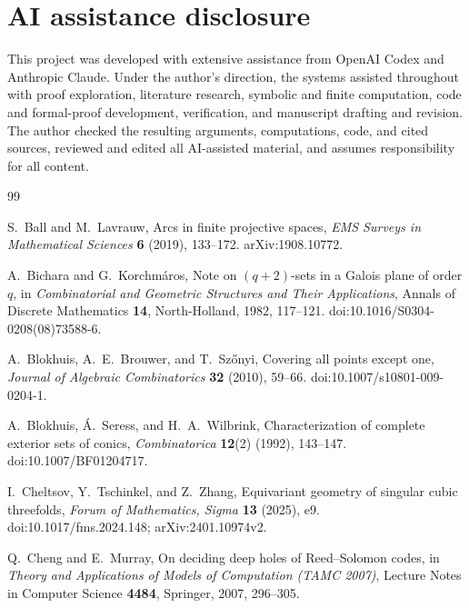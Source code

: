 \documentclass[11pt]{article}
\theoremstyle{definition}
\theoremstyle{remark}
\begin{document}
\section*{AI assistance disclosure}

This project was developed with extensive assistance from OpenAI Codex and
Anthropic Claude. Under the author's direction, the systems assisted
throughout with proof exploration, literature research, symbolic and finite
computation, code and formal-proof development, verification, and manuscript
drafting and revision. The author checked the resulting arguments,
computations, code, and cited sources, reviewed and edited all AI-assisted
material, and assumes responsibility for all content.


\small
\raggedright
\begin{thebibliography}{99}

S.~Ball and M.~Lavrauw,
\newblock Arcs in finite projective spaces,
\newblock \emph{EMS Surveys in Mathematical Sciences} \textbf{6} (2019),
133--172.
\newblock arXiv:1908.10772.

A.~Bichara and G.~Korchm\'aros,
\newblock Note on $(q+2)$-sets in a Galois plane of order $q$,
\newblock in \emph{Combinatorial and Geometric Structures and Their
Applications}, Annals of Discrete Mathematics \textbf{14}, North-Holland,
1982, 117--121.
\newblock doi:10.1016/S0304-0208(08)73588-6.

A.~Blokhuis, A.~E.~Brouwer, and T.~Sz\H{o}nyi,
\newblock Covering all points except one,
\newblock \emph{Journal of Algebraic Combinatorics} \textbf{32} (2010),
59--66.
\newblock doi:10.1007/s10801-009-0204-1.

A.~Blokhuis, Á.~Seress, and H.~A.~Wilbrink,
\newblock Characterization of complete exterior sets of conics,
\newblock \emph{Combinatorica} \textbf{12}(2) (1992), 143--147.
\newblock doi:10.1007/BF01204717.

I.~Cheltsov, Y.~Tschinkel, and Z.~Zhang,
\newblock Equivariant geometry of singular cubic threefolds,
\newblock \emph{Forum of Mathematics, Sigma} \textbf{13} (2025), e9.
\newblock doi:10.1017/fms.2024.148; arXiv:2401.10974v2.

Q.~Cheng and E.~Murray,
\newblock On deciding deep holes of Reed--Solomon codes,
\newblock in \emph{Theory and Applications of Models of Computation (TAMC
2007)}, Lecture Notes in Computer Science \textbf{4484}, Springer, 2007,
296--305.


\end{thebibliography}
\end{document}
